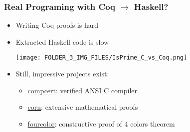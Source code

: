 
\begin{frame}

\frametitle{Real Programing with Coq $\longrightarrow$ Haskell?}

\begin{itemize}

\item<1-> Writing Coq proofs is hard

\item<2-> Extracted Haskell code is slow
\begin{center}
\texttt{[image: FOLDER\_3\_IMG\_FILES/IsPrime\_C\_vs\_Coq.png]}
\end{center}

\item<3-> Still, impressive projects exist:

\begin{itemize}

\item \href{http://compcert.inria.fr/}{compcert}: verified ANSI C compiler

\item \href{http://corn.cs.ru.nl/}{corn}: extensive mathematical proofs

\item \href{https://github.com/math-comp/fourcolor}{fourcolor}: constructive proof of 4 colors theorem

\end{itemize}

\end{itemize}

\end{frame}
